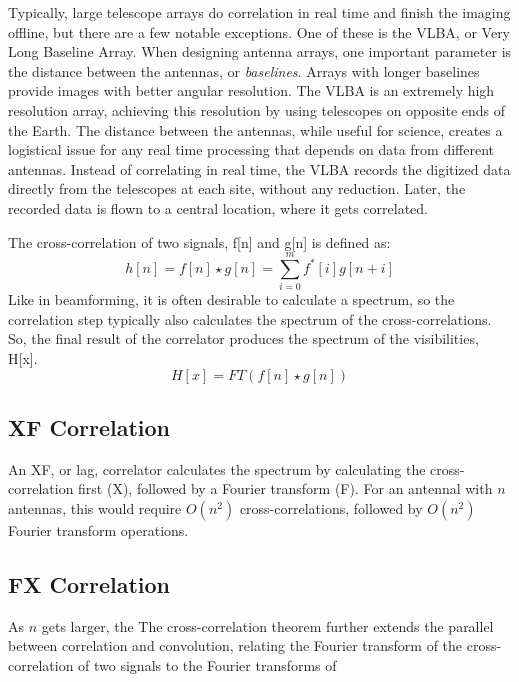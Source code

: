 Typically, large telescope arrays do correlation in real time and finish the imaging offline, but there are a few notable exceptions.
One of these is the VLBA, or Very Long Baseline Array. 
When designing antenna arrays, one important parameter is the distance between the antennas, or \emph{baselines}. 
Arrays with longer baselines provide images with better angular resolution. 
The VLBA is an extremely high resolution array, achieving this resolution by using telescopes on opposite ends of the Earth. 
The distance between the antennas, while useful for science, creates a logistical issue for any real time processing that depends on data from different antennas. 
Instead of correlating in real time, the VLBA records the digitized data directly from the telescopes at each site, without any reduction.
Later, the recorded data is flown to a central location, where it gets correlated.

The cross-correlation of two signals, f[n] and g[n] is defined as:
$$h[n] = f[n]\star g[n] = \sum_{i=0}^m f^*[i]g[n+i]$$
Like in beamforming, it is often desirable to calculate a spectrum, so the correlation step typically also calculates the spectrum of the cross-correlations. 
So, the final result of the correlator produces the spectrum of the visibilities, H[x].
$$H[x] = FT(f[n]\star g[n])$$


\subsection{XF Correlation}
An XF, or lag, correlator calculates the spectrum by calculating the cross-correlation first (X), followed by a Fourier transform (F).
For an antennal with $n$ antennas, this would require $O(n^2)$ cross-correlations, followed by $O(n^2)$ Fourier transform operations.
 


\subsection{FX Correlation}
As $n$ gets larger, the 
The cross-correlation theorem further extends the parallel between correlation and convolution, relating the Fourier transform of the cross-correlation of two signals to the Fourier transforms of 



%

